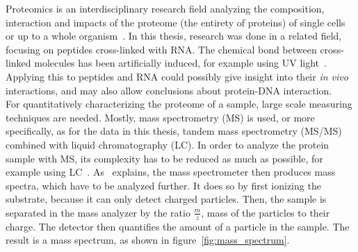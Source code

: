 	Proteomics is an interdisciplinary research field analyzing the composition, interaction and impacts of the proteome (the entirety of proteins) of single cells or up to a whole organism~\cite{Han2008, Sachsenberg2017}. In this thesis, research was done in a related field, focusing on peptides cross-linked with RNA. The chemical bond between cross-linked molecules has been artificially induced, for example using UV light~\cite{Sachsenberg2017}. Applying this to peptides and RNA could possibly give insight into their \textit{in vivo} interactions, and may also allow conclusions about protein-DNA interaction.\\
	For quantitatively characterizing the proteome of a sample, large scale measuring techniques are needed. Mostly, mass spectrometry (MS) is used, or more specifically, as for the data in this thesis, tandem mass spectrometry (MS/MS) combined with liquid chromatography (LC). In order to analyze the protein sample with MS, its complexity has to be reduced as much as possible, for example using LC~\cite{Sachsenberg2017}. As~\citet{Han2008} explains, the mass spectrometer then produces mass spectra, which have to be analyzed further. It does so by first ionizing the substrate, because it can only detect charged particles. Then, the sample is separated in the mass analyzer by the ratio $\frac{m}{z}$, mass of the particles to their charge. The detector then quantifies the amount of a particle in the sample. The result is a mass spectrum, as shown in figure~\ref{fig:mass_spectrum}.\\
	\renewcommand{\baselinestretch}{0.9}
